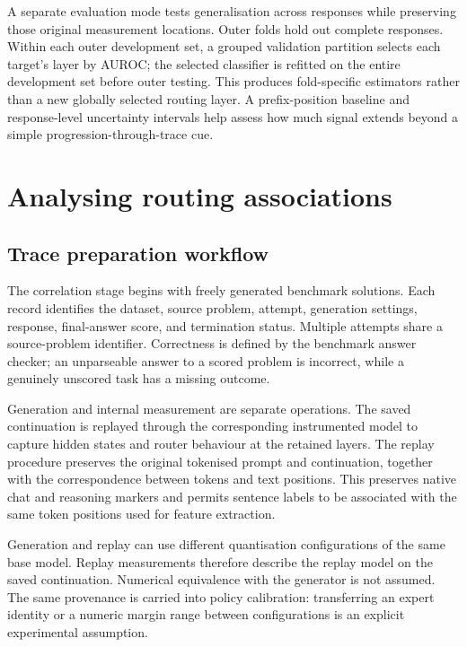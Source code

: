 \documentclass[12pt,a4paper,twoside,openright]{book}
\begin{document}
A separate evaluation mode tests generalisation across responses while
preserving those original measurement locations. Outer folds hold out
complete responses. Within each outer development set, a grouped validation
partition selects each target's layer by AUROC; the selected classifier is
refitted on the entire development set before outer testing. This produces
fold-specific estimators rather than a new globally selected routing layer.
A prefix-position baseline and response-level uncertainty intervals help
assess how much signal extends beyond a simple progression-through-trace cue.

\section{Analysing routing associations}
\label{sec:method-correlation}

\subsection{Trace preparation workflow}

The correlation stage begins with freely generated benchmark solutions.
Each record identifies the dataset, source problem, attempt, generation
settings, response, final-answer score, and termination status. Multiple
attempts share a source-problem identifier. Correctness is defined by the
benchmark answer checker; an unparseable answer to a scored problem is
incorrect, while a genuinely unscored task has a missing outcome.

Generation and internal measurement are separate operations. The saved
continuation is replayed through the corresponding instrumented model to
capture hidden states and router behaviour at the retained layers. The
replay procedure preserves the original tokenised prompt and continuation,
together with the correspondence between tokens and text positions. This preserves native chat and
reasoning markers and permits sentence labels to be associated with the
same token positions used for feature extraction.

Generation and replay can use different quantisation configurations of the same
base model. Replay measurements therefore describe the replay model
on the saved continuation. Numerical equivalence with the generator is not
assumed. The same provenance is carried into policy calibration: transferring
an expert identity or a numeric margin range between configurations is an
explicit experimental assumption.
\end{document}
